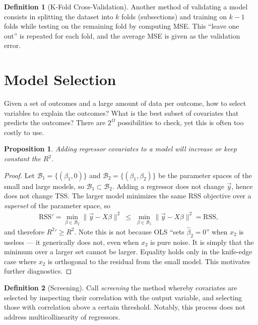 \documentclass[11pt]{article}
\theoremstyle{definition}
\newtheorem{definition}{Definition}[section]
\theoremstyle{plain}
\newtheorem{proposition}{Proposition}[section]
\theoremstyle{remark}
\begin{document}
\begin{definition}[K-Fold Cross-Validation]
Another method of validating a model consists in splitting the dataset into $k$ folds (subsections) and training on $k-1$ folds while testing on the remaining fold by computing MSE. This ``leave one out'' is repeated for each fold, and the average MSE is given as the validation error.
\end{definition}


\section{Model Selection}

Given a set of outcomes and a large amount of data per outcome, how to select variables to explain the outcomes? What is the best subset of covariates that predicts the outcomes? There are $2^\Omega$ possibilities to check, yet this is often too costly to use.

\begin{proposition}
    Adding regressor covariates to a model will increase or keep constant the $R^2$.
\end{proposition}
\begin{proof}
    Let $\mathcal{B}_1 = \{(\beta_1, 0)\}$ and $\mathcal{B}_2 = \{(\beta_1,\beta_2)\}$ be the parameter spaces of the small and large models, so $\mathcal{B}_1 \subset \mathcal{B}_2$. Adding a regressor does not change $\vec{y}$, hence does not change TSS. The larger model minimizes the same RSS objective over a \emph{superset} of the parameter space, so
    \begin{align}
        \text{RSS}' = \min_{\beta \in \mathcal{B}_2} \|\vec{y} - X\beta\|^2 \;\leq\; \min_{\beta \in \mathcal{B}_1}\|\vec{y}-X\beta\|^2 = \text{RSS},
    \end{align}
    and therefore $R^2{}' \geq R^2$. Note this is not because OLS ``sets $\hat{\beta}_2 = 0$'' when $x_2$ is useless --- it generically does not, even when $x_2$ is pure noise. It is simply that the minimum over a larger set cannot be larger. Equality holds only in the knife-edge case where $x_2$ is orthogonal to the residual from the small model. This motivates further diagnostics.
\end{proof}

\begin{definition}[Screening]
    Call \textit{screening} the method whereby covariates are selected by inspecting their correlation with the output variable, and selecting those with correlation above a certain threshold. Notably, this process does not address multicollinearity of regressors.
\end{definition}
\end{document}
